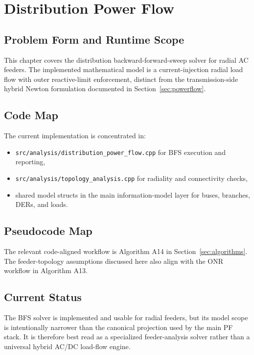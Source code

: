 \section{Distribution Power Flow}

\subsection{Problem Form and Runtime Scope}

This chapter covers the distribution backward-forward-sweep solver for radial AC
feeders.  The implemented mathematical model is a current-injection radial load
flow with outer reactive-limit enforcement, distinct from the transmission-side
hybrid Newton formulation documented in Section~\ref{sec:powerflow}.

\subsection{Code Map}

The current implementation is concentrated in:
\begin{itemize}
  \item \texttt{src/analysis/distribution\_power\_flow.cpp} for BFS execution and reporting,
  \item \texttt{src/analysis/topology\_analysis.cpp} for radiality and connectivity checks,
  \item shared model structs in the main information-model layer for buses, branches, DERs, and loads.
\end{itemize}

\subsection{Pseudocode Map}

The relevant code-aligned workflow is Algorithm A14 in
Section~\ref{sec:algorithms}.  The feeder-topology assumptions discussed here
also align with the ONR workflow in Algorithm A13.

\subsection{Current Status}

The BFS solver is implemented and usable for radial feeders, but its model scope
is intentionally narrower than the canonical projection used by the main PF
stack.  It is therefore best read as a specialized feeder-analysis solver rather
than a universal hybrid AC/DC load-flow engine.

